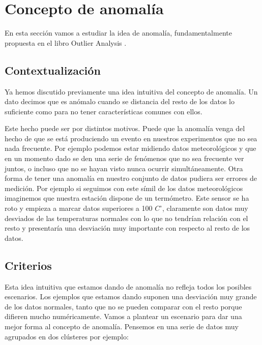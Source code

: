 \chapter{Concepto de anomalía}
\label{chapter:anomalia}

En esta sección vamos a estudiar la idea de anomalía, fundamentalmente propuesta en el libro Outlier Analysis \cite{aggarwal_outlier_2017-1}.

\section{Contextualización}

Ya hemos discutido previamente una idea intuitiva del concepto de anomalía. Un dato decimos que es anómalo cuando se distancia del resto de los datos lo suficiente como para no tener características comunes con ellos.

Este hecho puede ser por distintos motivos. Puede que la anomalía venga del hecho de que se está produciendo un evento en nuestros experimentos que no sea nada frecuente. Por ejemplo podemos estar midiendo datos meteorológicos y que en un momento dado se den una serie de fenómenos que no sea frecuente ver juntos, o incluso que no se hayan visto nunca ocurrir simultáneamente. Otra forma de tener una anomalía en nuestro conjunto de datos pudiera ser errores de medición. Por ejemplo si seguimos con este símil de los datos meteorológicos imaginemos que nuestra estación dispone de un termómetro. Este sensor se ha roto y empieza a marcar datos superiores a 100 $C^\circ$, claramente son datos muy desviados de las temperaturas normales con lo que no tendrían relación con el resto y presentaría una desviación muy importante con respecto al resto de los datos.

\section{Criterios}

Esta idea intuitiva que estamos dando de anomalía no refleja todos los posibles escenarios. Los ejemplos que estamos dando suponen una desviación muy grande de los datos normales, tanto que no se pueden comparar con el resto porque difieren mucho numéricamente. Vamos a plantear un escenario para dar una mejor forma al concepto de anomalía. Pensemos en una serie de datos muy agrupados en dos clústeres por ejemplo:

